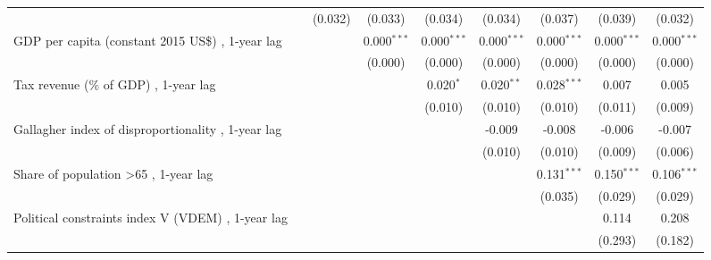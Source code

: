 \begin{table}[htbp]
\begin{tabular}{lcccccccc}
                                                                              &              & (0.032)       & (0.033)        & (0.034)        & (0.034)        & (0.037)        & (0.039)        & (0.032)\\   
      GDP per capita (constant 2015 US\$) , 1-year lag                        &              &               & 0.000$^{***}$  & 0.000$^{***}$  & 0.000$^{***}$  & 0.000$^{***}$  & 0.000$^{***}$  & 0.000$^{***}$\\   
                                                                              &              &               & (0.000)        & (0.000)        & (0.000)        & (0.000)        & (0.000)        & (0.000)\\   
      Tax revenue (\% of GDP) , 1-year lag                                    &              &               &                & 0.020$^{*}$    & 0.020$^{**}$   & 0.028$^{***}$  & 0.007          & 0.005\\   
                                                                              &              &               &                & (0.010)        & (0.010)        & (0.010)        & (0.011)        & (0.009)\\   
      Gallagher index of disproportionality , 1-year lag                      &              &               &                &                & -0.009         & -0.008         & -0.006         & -0.007\\   
                                                                              &              &               &                &                & (0.010)        & (0.010)        & (0.009)        & (0.006)\\   
      Share of population >65 , 1-year lag                                    &              &               &                &                &                & 0.131$^{***}$  & 0.150$^{***}$  & 0.106$^{***}$\\   
                                                                              &              &               &                &                &                & (0.035)        & (0.029)        & (0.029)\\   
      Political constraints index V (VDEM) , 1-year lag                       &              &               &                &                &                &                & 0.114          & 0.208\\   
                                                                              &              &               &                &                &                &                & (0.293)        & (0.182)\\   

\end{tabular}
\end{table}
